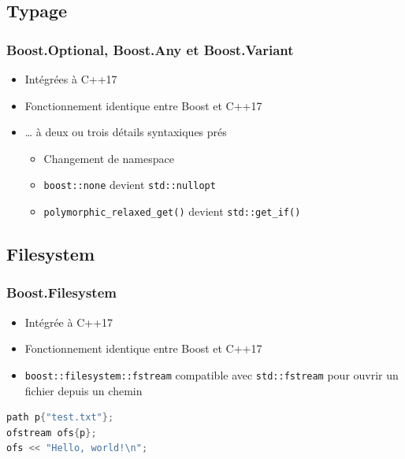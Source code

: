 \documentclass[C++.tex]{subfiles}
\begin{document}
\subsection*{Typage}
\begin{frame}[fragile]
	\frametitle{Boost.Optional, Boost.Any et Boost.Variant}
	\begin{itemize}
		\item Intégrées à C++17
		\item Fonctionnement identique entre Boost et C++17
		\item \ldots{} à deux ou trois détails syntaxiques prés
		\begin{itemize}
			\item Changement de namespace
			\item \lstinline|boost::none| devient \lstinline|std::nullopt|
			\item \lstinline|polymorphic_relaxed_get()| devient \lstinline|std::get_if()|
		\end{itemize}
	\end{itemize}
\end{frame}

\subsection*{Filesystem}
\begin{frame}[fragile]
	\frametitle{Boost.Filesystem}
	\begin{itemize}
		\item Intégrée à C++17
		\item Fonctionnement identique entre Boost et C++17
		\item \lstinline|boost::filesystem::fstream| compatible avec \lstinline|std::fstream| pour ouvrir un fichier depuis un chemin

	\end{itemize}

	\begin{lstlisting}[language=C++]
path p{"test.txt"};
ofstream ofs{p};
ofs << "Hello, world!\n";\end{lstlisting}
\end{frame}
\end{document}

